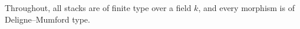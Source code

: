 \begin{theorem}\label{Man12-setup}
Throughout, all stacks are of finite type over a field $k$, and every morphism is of Deligne--Mumford type.
\end{theorem}